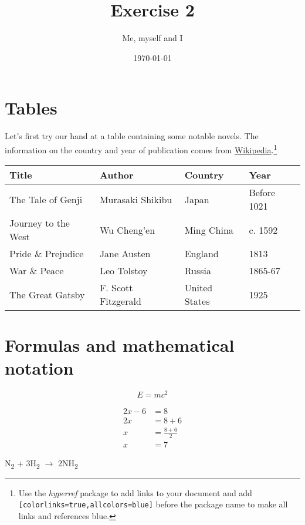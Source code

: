 \documentclass[a4paper]{article}
\title{Exercise 2}
\author{Me, myself and I}
\date{\today}
\begin{document}
\maketitle
	
\section*{Tables}

\noindent Let's first try our hand at a table containing some notable novels. The information on the country and year of publication comes from \href{https://en.wikipedia.org/wiki/Main_Page}{Wikipedia}.\footnote{Use the \textit{hyperref} package to add links to your document and add \texttt{[colorlinks=true,allcolors=blue]} before the package name to make all links and references blue.}

\begin{center}
\begin{tabular}{||l | l | l | l ||} 
 \hline
 Title & Author & Country & Year\\ [1ex] 
 \hline\hline 
 The Tale of Genji & Murasaki Shikibu & Japan & Before 1021 \\  
 \hline
 Journey to the West & Wu Cheng'en & Ming China & c. 1592 \\
 \hline
 Pride \& Prejudice & Jane Austen & England & 1813 \\ 
 \hline
 War \& Peace & Leo Tolstoy & Russia & 1865-67 \\
 \hline
  The Great Gatsby & F. Scott Fitzgerald & United States & 1925 \\
 \hline
\end{tabular}
\end{center}

\section*{Formulas and mathematical notation}
\begin{equation*}
    E = mc^2
\end{equation*}

\begin{align*} 
2x - 6 &=  8 \\ 
2x &=  8 + 6\\
  x  &= \frac{8 + 6}{2}\\
  x &= 7
\end{align*}

\begin{center}
\noindent N\textsubscript{2} + 3H\textsubscript{2} $\rightarrow$ 2NH\textsubscript{2}    
\end{center}
\end{document}
